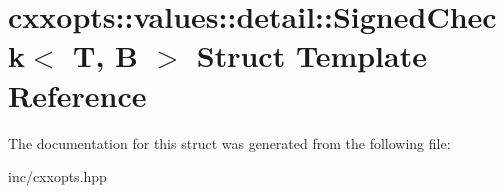 \hypertarget{structcxxopts_1_1values_1_1detail_1_1SignedCheck}{}\section{cxxopts\+:\+:values\+:\+:detail\+:\+:Signed\+Check$<$ T, B $>$ Struct Template Reference}
\label{structcxxopts_1_1values_1_1detail_1_1SignedCheck}


The documentation for this struct was generated from the following file\+:\begin{DoxyCompactItemize}
\item 
inc/cxxopts.\+hpp\end{DoxyCompactItemize}
